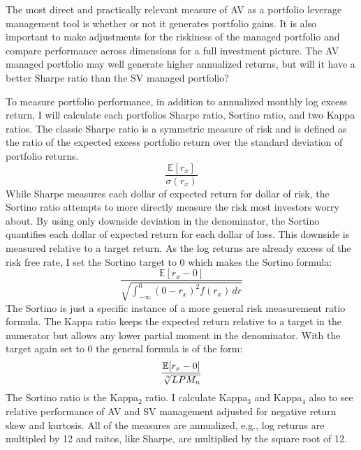 The most direct and practically relevant measure of AV as a portfolio leverage management tool is whether or not it generates portfolio gains. It is also important to make adjustments for the riskiness of the managed portfolio and compare performance across dimensions for a full investment picture. The AV managed portfolio may well generate higher annualized returns, but will it have a better Sharpe ratio than the SV managed portfolio?

To measure portfolio performance, in addition to annualized monthly log excess return, I will calculate each portfolios Sharpe ratio, Sortino ratio, and two Kappa ratios. The classic Sharpe ratio is a symmetric measure of risk and is defined as the ratio of the expected excess portfolio return over the standard deviation of portfolio returns.
\begin{equation}
	\frac{\mathbb{E}[r_{x}]}{\sigma(r_{x})}
\end{equation}
While Sharpe measures each dollar of expected return for dollar of risk, the Sortino ratio attempts to more directly measure the risk most investors worry about. By using only downside deviation in the denominator, the Sortino quantifies each dollar of expected return for each dollar of loss. This downside is measured relative to a target return. \citep{sortino_performance_1994} As the log returns are already excess of the risk free rate, I set the Sortino target to 0 which makes the Sortino formula:
\begin{equation}
	\frac{\mathbb{E}[r_{x} - 0]}{\sqrt  {\int _{{-\infty }}^{0}(0-r_{x})^{2}f(r_{x})\,dr}}
\end{equation}
The Sortino is just a specific instance of a more general risk measurement ratio formula. The Kappa ratio keeps the expected return relative to a target in the numerator but allows any lower partial moment in the denominator. \citep{kaplan_kappa:_2004} With the target again set to 0 the general formula is of the form:
\begin{equation}
\frac{\mathbb{E}[r_{x} - 0]}{\sqrt[\leftroot{-2}\uproot{2}n]{LPM_{n}}} 
\end{equation}
The Sortino ratio is the Kappa$_{2}$ ratio. I calculate Kappa$_{3}$ and Kappa$_{4}$ also to see relative performance of AV and SV management adjusted for negative return skew and kurtosis. All of the measures are annualized, e.g., log returns are multipled by 12 and raitos, like Sharpe, are multiplied by the square root of 12. 

